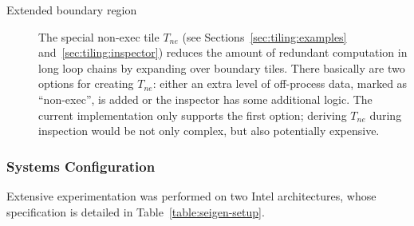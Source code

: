 \begin{description}
\item[Extended boundary region] The special non-exec tile $T_{ne}$ (see Sections~\ref{sec:tiling:examples} and~\ref{sec:tiling:inspector}) reduces the amount of redundant computation in long loop chains by expanding over boundary tiles. There basically are two options for creating $T_{ne}$: either an extra level of off-process data, marked as ``non-exec'', is added or the inspector has some additional logic. The current implementation only supports the first option; deriving $T_{ne}$ during inspection would be not only complex, but also potentially expensive. 
\end{description}



\subsubsection{Systems Configuration}
Extensive experimentation was performed on two Intel architectures, whose specification is detailed in Table~\ref{table:seigen-setup}. 

\begin{table}[htpb]
\scriptsize
{}
\caption{Systems specification.}
\label{table:seigen-setup}
\end{table}

